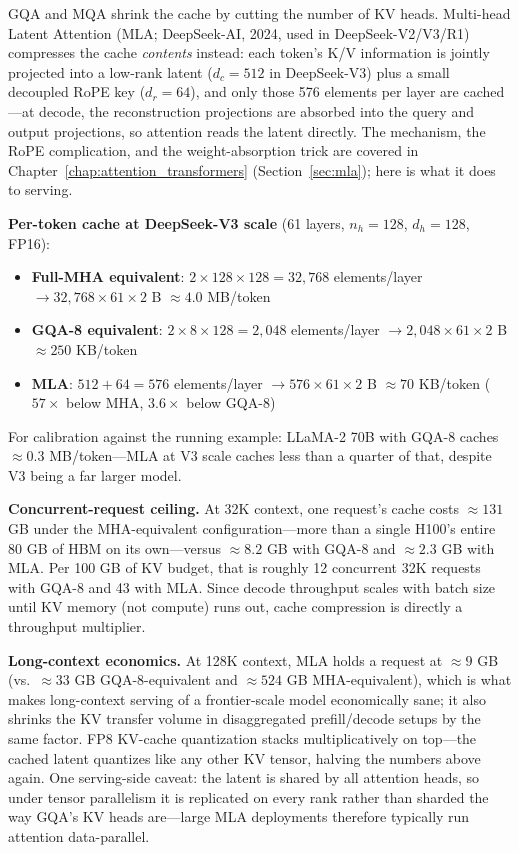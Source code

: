 GQA and MQA shrink the cache by cutting the number of KV heads. Multi-head Latent Attention (MLA; DeepSeek-AI, 2024, used in DeepSeek-V2/V3/R1) compresses the cache \textit{contents} instead: each token's K/V information is jointly projected into a low-rank latent ($d_c = 512$ in DeepSeek-V3) plus a small decoupled RoPE key ($d_r = 64$), and only those 576 elements per layer are cached---at decode, the reconstruction projections are absorbed into the query and output projections, so attention reads the latent directly. The mechanism, the RoPE complication, and the weight-absorption trick are covered in Chapter~\ref{chap:attention_transformers} (Section~\ref{sec:mla}); here is what it does to serving.

\textbf{Per-token cache at DeepSeek-V3 scale} (61 layers, $n_h = 128$, $d_h = 128$, FP16):
\begin{itemize}
    \item \textbf{Full-MHA equivalent}: $2 \times 128 \times 128 = 32{,}768$ elements/layer $\to 32{,}768 \times 61 \times 2$ B $\approx 4.0$ MB/token
    \item \textbf{GQA-8 equivalent}: $2 \times 8 \times 128 = 2{,}048$ elements/layer $\to 2{,}048 \times 61 \times 2$ B $\approx 250$ KB/token
    \item \textbf{MLA}: $512 + 64 = 576$ elements/layer $\to 576 \times 61 \times 2$ B $\approx 70$ KB/token ($57\times$ below MHA, $3.6\times$ below GQA-8)
\end{itemize}
For calibration against the running example: LLaMA-2 70B with GQA-8 caches $\approx 0.3$ MB/token---MLA at V3 scale caches less than a quarter of that, despite V3 being a far larger model.

\textbf{Concurrent-request ceiling.} At 32K context, one request's cache costs $\approx 131$ GB under the MHA-equivalent configuration---more than a single H100's entire 80 GB of HBM on its own---versus $\approx 8.2$ GB with GQA-8 and $\approx 2.3$ GB with MLA. Per 100 GB of KV budget, that is roughly 12 concurrent 32K requests with GQA-8 and 43 with MLA. Since decode throughput scales with batch size until KV memory (not compute) runs out, cache compression is directly a throughput multiplier.

\textbf{Long-context economics.} At 128K context, MLA holds a request at $\approx 9$ GB (vs.\ $\approx 33$ GB GQA-8-equivalent and $\approx 524$ GB MHA-equivalent), which is what makes long-context serving of a frontier-scale model economically sane; it also shrinks the KV transfer volume in disaggregated prefill/decode setups by the same factor. FP8 KV-cache quantization stacks multiplicatively on top---the cached latent quantizes like any other KV tensor, halving the numbers above again. One serving-side caveat: the latent is shared by all attention heads, so under tensor parallelism it is replicated on every rank rather than sharded the way GQA's KV heads are---large MLA deployments therefore typically run attention data-parallel.

